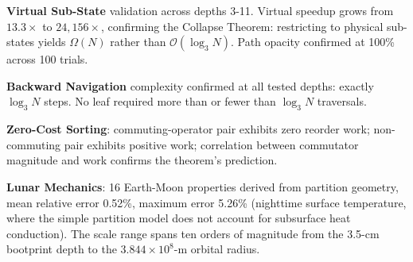 \documentclass[twocolumn,11pt,a4paper]{article}
\begin{document}
\textbf{Virtual Sub-State} validation across depths 3-11. Virtual speedup grows from $13.3\times$ to $24{,}156\times$, confirming the Collapse Theorem: restricting to physical sub-states yields $\Omega(N)$ rather than $\mathcal{O}(\log_3 N)$. Path opacity confirmed at 100\% across 100 trials.

\textbf{Backward Navigation} complexity confirmed at all tested depths: exactly $\log_3 N$ steps. No leaf required more than or fewer than $\log_3 N$ traversals.

\textbf{Zero-Cost Sorting}: commuting-operator pair exhibits zero reorder work; non-commuting pair exhibits positive work; correlation between commutator magnitude and work confirms the theorem's prediction.

\textbf{Lunar Mechanics}: 16 Earth-Moon properties derived from partition geometry, mean relative error 0.52\%, maximum error 5.26\% (nighttime surface temperature, where the simple partition model does not account for subsurface heat conduction). The scale range spans ten orders of magnitude from the 3.5-cm bootprint depth to the $3.844 \times 10^8$-m orbital radius.
\end{document}
